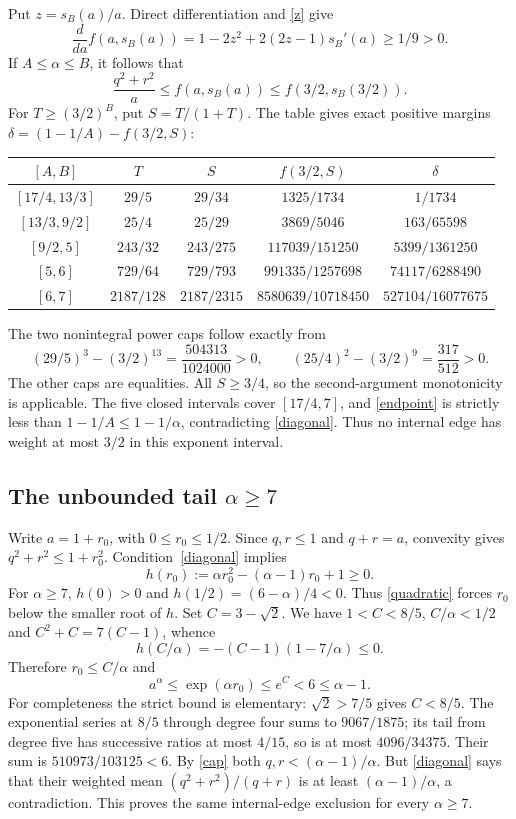 \documentclass[11pt]{article}
\begin{document}
Put $z=s_B(a)/a$. Direct differentiation and \eqref{z} give
\[
 \frac{d}{da}f(a,s_B(a))
 =1-2z^2+2(2z-1)s_B'(a)\ge1/9>0.
\]
If $A\le\alpha\le B$, it follows that
\begin{equation}\label{endpoint}
 \frac{q^2+r^2}a\le f(a,s_B(a))\le f(3/2,s_B(3/2)).
\end{equation}
For $T\ge(3/2)^B$, put $S=T/(1+T)$. The table gives exact
positive margins $\delta=(1-1/A)-f(3/2,S)$:
\begin{center}
\small
\begin{tabular}{ccccc}
\toprule
$[A,B]$ & $T$ & $S$ & $f(3/2,S)$ & $\delta$\\
\midrule
$[17/4,13/3]$ & $29/5$ & $29/34$ & $1325/1734$ & $1/1734$\\
$[13/3,9/2]$ & $25/4$ & $25/29$ & $3869/5046$ & $163/65598$\\
$[9/2,5]$ & $243/32$ & $243/275$ & $117039/151250$ & $5399/1361250$\\
$[5,6]$ & $729/64$ & $729/793$ & $991335/1257698$ & $74117/6288490$\\
$[6,7]$ & $2187/128$ & $2187/2315$ & $8580639/10718450$ & $527104/16077675$\\
\bottomrule
\end{tabular}
\end{center}
The two nonintegral power caps follow exactly from
\[
 (29/5)^3-(3/2)^{13}=\frac{504313}{1024000}>0,
 \qquad
 (25/4)^2-(3/2)^9=\frac{317}{512}>0.
\]
The other caps are equalities. All $S\ge3/4$, so the second-argument
monotonicity is applicable. The five closed intervals cover $[17/4,7]$,
and \eqref{endpoint} is strictly less than
$1-1/A\le1-1/\alpha$, contradicting \eqref{diagonal}.
Thus no internal edge has weight at most $3/2$ in this exponent interval.

\subsection{The unbounded tail $\alpha\ge7$}
Write $a=1+r_0$, with $0\le r_0\le1/2$. Since $q,r\le1$
and $q+r=a$, convexity gives $q^2+r^2\le1+r_0^2$.
Condition~\eqref{diagonal} implies
\begin{equation}\label{quadratic}
 h(r_0):=\alpha r_0^2-(\alpha-1)r_0+1\ge0.
\end{equation}
For $\alpha\ge7$, $h(0)>0$ and $h(1/2)=(6-\alpha)/4<0$.
Thus \eqref{quadratic} forces $r_0$ below the smaller root of $h$.
Set $C=3-\sqrt2$. We have $1<C<8/5$, $C/\alpha<1/2$ and
$C^2+C=7(C-1)$, whence
\[
 h(C/\alpha)=-(C-1)(1-7/\alpha)\le0.
\]
Therefore $r_0\le C/\alpha$ and
\[
 a^\alpha\le\exp(\alpha r_0)\le e^C<6\le\alpha-1.
\]
For completeness the strict bound is elementary: $\sqrt2>7/5$ gives
$C<8/5$. The exponential series at $8/5$ through degree four sums
to $9067/1875$; its tail from degree five has successive ratios at
most $4/15$, so is at most $4096/34375$. Their sum is
$510973/103125<6$.
By \eqref{cap} both $q,r<(\alpha-1)/\alpha$. But
\eqref{diagonal} says that their weighted mean
$(q^2+r^2)/(q+r)$ is at least $(\alpha-1)/\alpha$, a contradiction.
This proves the same internal-edge exclusion for every $\alpha\ge7$.
\end{document}
